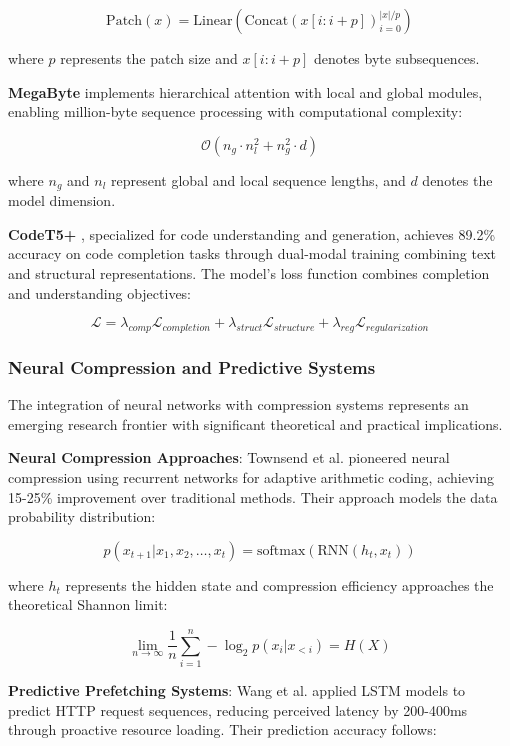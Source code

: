 \documentclass[12pt,a4paper]{article}
\begin{document}
$$\text{Patch}(x) = \text{Linear}\left(\text{Concat}\left(x[i:i+p]\right)_{i=0}^{|x|/p}\right)$$

where $p$ represents the patch size and $x[i:i+p]$ denotes byte subsequences.

\textbf{MegaByte} \cite{megabyte2023} implements hierarchical attention with local and global modules, enabling million-byte sequence processing with computational complexity:

$$\mathcal{O}(n_g \cdot n_l^2 + n_g^2 \cdot d)$$

where $n_g$ and $n_l$ represent global and local sequence lengths, and $d$ denotes the model dimension.

\textbf{CodeT5+} \cite{codet5plus2023}, specialized for code understanding and generation, achieves 89.2\% accuracy on code completion tasks through dual-modal training combining text and structural representations. The model's loss function combines completion and understanding objectives:

$$\mathcal{L} = \lambda_{comp} \mathcal{L}_{completion} + \lambda_{struct} \mathcal{L}_{structure} + \lambda_{reg} \mathcal{L}_{regularization}$$

\subsubsection{Neural Compression and Predictive Systems}

The integration of neural networks with compression systems represents an emerging research frontier with significant theoretical and practical implications.

\textbf{Neural Compression Approaches}: Townsend et al. \cite{townsend2019neural} pioneered neural compression using recurrent networks for adaptive arithmetic coding, achieving 15-25\% improvement over traditional methods. Their approach models the data probability distribution:

$$p(x_{t+1}|x_1, x_2, \ldots, x_t) = \text{softmax}(\text{RNN}(h_t, x_t))$$

where $h_t$ represents the hidden state and compression efficiency approaches the theoretical Shannon limit:

$$\lim_{n \to \infty} \frac{1}{n} \sum_{i=1}^{n} -\log_2 p(x_i|x_{<i}) = H(X)$$

\textbf{Predictive Prefetching Systems}: Wang et al. \cite{wang2020predictive} applied LSTM models to predict HTTP request sequences, reducing perceived latency by 200-400ms through proactive resource loading. Their prediction accuracy follows:
\end{document}
